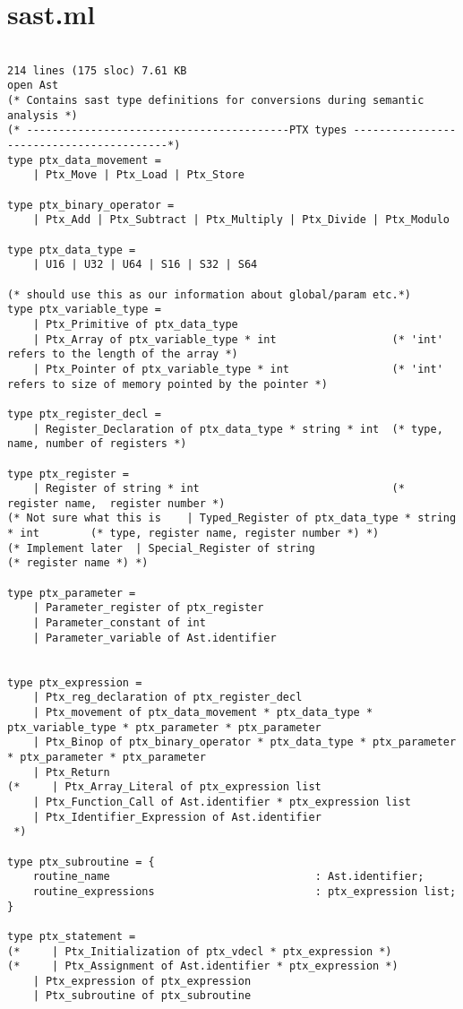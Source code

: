 \section{sast.ml}
\begin{verbatim}

214 lines (175 sloc) 7.61 KB
open Ast
(* Contains sast type definitions for conversions during semantic analysis *)
(* -----------------------------------------PTX types -----------------------------------------*)
type ptx_data_movement = 
	| Ptx_Move | Ptx_Load | Ptx_Store

type ptx_binary_operator =
    | Ptx_Add | Ptx_Subtract | Ptx_Multiply | Ptx_Divide | Ptx_Modulo

type ptx_data_type =
	| U16 | U32 | U64 | S16 | S32 | S64

(* should use this as our information about global/param etc.*)
type ptx_variable_type = 
	| Ptx_Primitive of ptx_data_type
	| Ptx_Array of ptx_variable_type * int 					(* 'int' refers to the length of the array *)
	| Ptx_Pointer of ptx_variable_type * int 				(* 'int' refers to size of memory pointed by the pointer *)

type ptx_register_decl = 
	| Register_Declaration of ptx_data_type * string * int 	(* type, name, number of registers *)

type ptx_register = 
	| Register of string * int 								(* register name,  register number *)
(* Not sure what this is	| Typed_Register of ptx_data_type * string * int 		(* type, register name, register number *) *)
(* Implement later	| Special_Register of string 							(* register name *) *)

type ptx_parameter = 
	| Parameter_register of ptx_register
	| Parameter_constant of int 
	| Parameter_variable of Ast.identifier


type ptx_expression =
	| Ptx_reg_declaration of ptx_register_decl
	| Ptx_movement of ptx_data_movement * ptx_data_type * ptx_variable_type * ptx_parameter * ptx_parameter
	| Ptx_Binop of ptx_binary_operator * ptx_data_type * ptx_parameter * ptx_parameter * ptx_parameter
	| Ptx_Return
(*     | Ptx_Array_Literal of ptx_expression list 
	| Ptx_Function_Call of Ast.identifier * ptx_expression list
	| Ptx_Identifier_Expression of Ast.identifier
 *)

type ptx_subroutine = {
	routine_name								: Ast.identifier;
	routine_expressions							: ptx_expression list;
}

type ptx_statement = 
(*     | Ptx_Initialization of ptx_vdecl * ptx_expression *)
(*     | Ptx_Assignment of Ast.identifier * ptx_expression *)
    | Ptx_expression of ptx_expression
    | Ptx_subroutine of ptx_subroutine


\end{verbatim}
